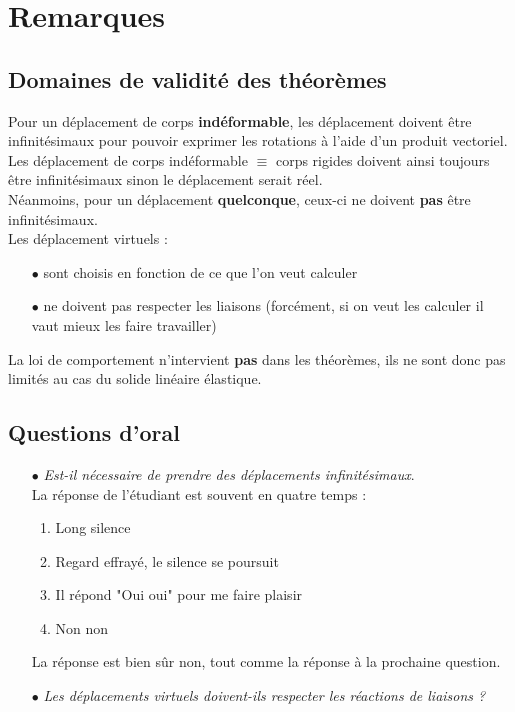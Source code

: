 \section{Remarques}
	\subsection{Domaines de validité des théorèmes}
	Pour un déplacement de corps \textbf{indéformable}, les déplacement doivent 
	être infinitésimaux pour pouvoir exprimer les rotations à l'aide d'un produit 
	vectoriel. Les déplacement de corps indéformable $\equiv$ corps rigides 
	doivent ainsi toujours être infinitésimaux sinon le déplacement serait réel.\\
	
	Néanmoins, pour un déplacement \textbf{quelconque}, ceux-ci ne doivent 
	\textbf{pas} être infinitésimaux. \\
	
	Les déplacement virtuels :
	\begin{itemize}
	\item[$\bullet$] sont choisis en fonction de ce que l'on veut calculer
	\item[$\bullet$] ne doivent pas respecter les liaisons (forcément, si on veut 
	les calculer il vaut mieux les faire travailler)
	\end{itemize}
	
	\danger La loi de comportement n'intervient \textbf{pas} dans les théorèmes, 
	ils ne sont donc pas limités au cas du solide linéaire élastique.
	
	\subsection{Questions d'oral}
	\begin{itemize}
	\item[$\bullet$] \textit{Est-il nécessaire de prendre des déplacements 
	infinitésimaux}. \\
	La réponse de l'étudiant est souvent en quatre temps :
	\begin{enumerate}
	\item Long silence
	\item Regard effrayé, le silence se poursuit
	\item Il répond "Oui oui" pour me faire plaisir
	\item Non non
	\end{enumerate}
	La réponse est bien sûr non, tout comme la réponse à la prochaine question.
	\item[$\bullet$] \textit{Les déplacements virtuels doivent-ils respecter les 
	réactions de liaisons ?}
	\end{itemize}